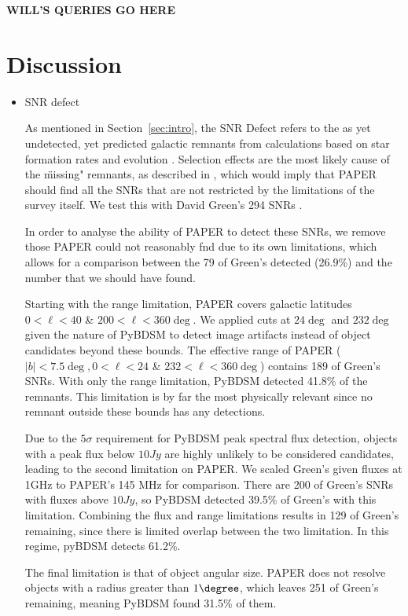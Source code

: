 \documentclass[useAMS,usenatbib]{mn2e}
\begin{document}
{\bf WILL'S QUERIES GO HERE}

\section{Discussion}
\label{sec:disc}

\begin{itemize}
\item SNR defect

As mentioned in Section~\ref{sec:intro}, the SNR Defect refers to the as yet undetected, yet predicted galactic remnants from calculations based on star formation rates and evolution \citep{Li.91,Pavlovic.13}.  Selection effects are the most likely cause of the \"missing" remnants, as described in , which would imply that PAPER should find all the SNRs that are not restricted by the limitations of the survey itself.  We test this with David Green's 294 SNRs .  

In order to analyse the ability of PAPER to detect these SNRs, we remove those PAPER could not reasonably fnd due to its own limitations, which allows for a comparison between the 79 of Green’s detected (26.9\%) and the number that we should have found.  

Starting with the range limitation, PAPER covers galactic latitudes $0 < \ell < 40$ \& $200 < \ell < 360 \deg$.  We applied cuts at $24 \deg$ and $232 \deg$ given the nature of PyBDSM to detect image artifacts instead of object candidates beyond these bounds.  The effective range of PAPER ($|b| < 7.5 \deg, 0 < \ell < 24$ \& $232 < \ell < 360 \deg$) contains 189 of Green’s SNRs.  With only the range limitation, PyBDSM detected 41.8\% of the remnants.  This limitation is by far the most physically relevant since no remnant outside these bounds has any detections. 

Due to the $5σ$ requirement for PyBDSM peak spectral flux detection, objects with a peak flux below $10 Jy$ are highly unlikely to be considered candidates, leading to the second limitation on PAPER.  We scaled Green’s given fluxes at 1GHz to PAPER’s 145 MHz for comparison.  There are 200 of Green’s SNRs with fluxes above $10 Jy$, so PyBDSM detected 39.5\% of Green’s with this limitation.  Combining the flux and range limitations results in 129 of Green’s remaining, since there is limited overlap between the two limitation.  In this regime, pyBDSM detects 61.2\%.  

The final limitation is that of object angular size.  PAPER does not resolve objects with a radius greater than $1 \degree$, which leaves 251 of Green’s remaining, meaning PyBDSM found 31.5\% of them.  


\end{itemize}
\end{document}
